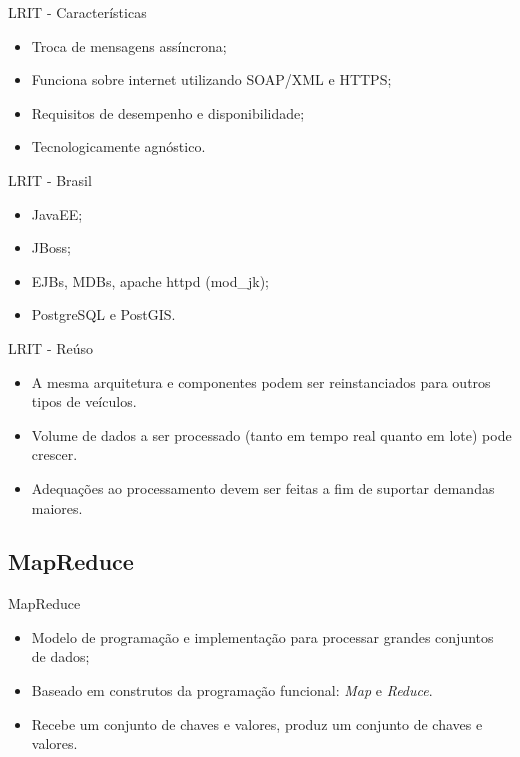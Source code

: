 \documentclass{beamer}
\begin{document}
		\begin{frame}{LRIT - Características}
			\begin{itemize}
			\item Troca de mensagens assíncrona;
			\item Funciona sobre internet utilizando SOAP/XML e HTTPS;
			\item Requisitos de desempenho e disponibilidade;
			\item Tecnologicamente agnóstico.
			\end{itemize}
		\end{frame}

		\begin{frame}{LRIT - Brasil}
			\begin{itemize}
			\item JavaEE;
			\item JBoss;
			\item EJBs, MDBs, apache httpd (mod\_jk);
			\item PostgreSQL e PostGIS.
			\end{itemize}
		\end{frame}

		\begin{frame}{LRIT - Reúso}
			\begin{itemize}
				\item A mesma arquitetura e componentes podem ser reinstanciados para outros tipos de veículos.
				\item Volume de dados a ser processado (tanto em tempo real quanto em lote) pode crescer.
				\item Adequações ao processamento devem ser feitas a fim de suportar demandas maiores.
			\end{itemize}
		\end{frame}

	\subsection{MapReduce}
		\begin{frame}{MapReduce\cite{google_mapreduce}}
		\begin{itemize}
			\item Modelo de programação e implementação para processar grandes conjuntos de dados;
			\item Baseado em construtos da programação funcional: \textit{Map} e \textit{Reduce}.
			\item Recebe um conjunto de chaves e valores, produz um conjunto de chaves e valores.
		\end{itemize}
		\end{frame}
\end{document}
